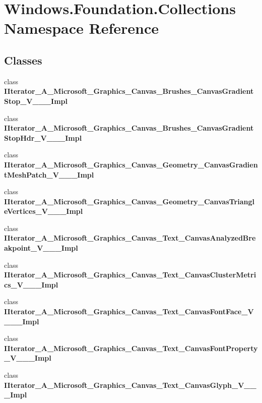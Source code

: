 \hypertarget{namespace_windows_1_1_foundation_1_1_collections}{}\section{Windows.\+Foundation.\+Collections Namespace Reference}
\label{namespace_windows_1_1_foundation_1_1_collections}
\subsection*{Classes}
\begin{DoxyCompactItemize}
\item 
class {\bfseries I\+Iterator\+\_\+\+A\+\_\+\+Microsoft\+\_\+\+Graphics\+\_\+\+Canvas\+\_\+\+Brushes\+\_\+\+Canvas\+Gradient\+Stop\+\_\+\+V\+\_\+\+\_\+\+\_\+\+Impl}
\item 
class {\bfseries I\+Iterator\+\_\+\+A\+\_\+\+Microsoft\+\_\+\+Graphics\+\_\+\+Canvas\+\_\+\+Brushes\+\_\+\+Canvas\+Gradient\+Stop\+Hdr\+\_\+\+V\+\_\+\+\_\+\+\_\+\+Impl}
\item 
class {\bfseries I\+Iterator\+\_\+\+A\+\_\+\+Microsoft\+\_\+\+Graphics\+\_\+\+Canvas\+\_\+\+Geometry\+\_\+\+Canvas\+Gradient\+Mesh\+Patch\+\_\+\+V\+\_\+\+\_\+\+\_\+\+Impl}
\item 
class {\bfseries I\+Iterator\+\_\+\+A\+\_\+\+Microsoft\+\_\+\+Graphics\+\_\+\+Canvas\+\_\+\+Geometry\+\_\+\+Canvas\+Triangle\+Vertices\+\_\+\+V\+\_\+\+\_\+\+\_\+\+Impl}
\item 
class {\bfseries I\+Iterator\+\_\+\+A\+\_\+\+Microsoft\+\_\+\+Graphics\+\_\+\+Canvas\+\_\+\+Text\+\_\+\+Canvas\+Analyzed\+Breakpoint\+\_\+\+V\+\_\+\+\_\+\+\_\+\+Impl}
\item 
class {\bfseries I\+Iterator\+\_\+\+A\+\_\+\+Microsoft\+\_\+\+Graphics\+\_\+\+Canvas\+\_\+\+Text\+\_\+\+Canvas\+Cluster\+Metrics\+\_\+\+V\+\_\+\+\_\+\+\_\+\+Impl}
\item 
class {\bfseries I\+Iterator\+\_\+\+A\+\_\+\+Microsoft\+\_\+\+Graphics\+\_\+\+Canvas\+\_\+\+Text\+\_\+\+Canvas\+Font\+Face\+\_\+\+V\+\_\+\+\_\+\+\_\+\+Impl}
\item 
class {\bfseries I\+Iterator\+\_\+\+A\+\_\+\+Microsoft\+\_\+\+Graphics\+\_\+\+Canvas\+\_\+\+Text\+\_\+\+Canvas\+Font\+Property\+\_\+\+V\+\_\+\+\_\+\+\_\+\+Impl}
\item 
class {\bfseries I\+Iterator\+\_\+\+A\+\_\+\+Microsoft\+\_\+\+Graphics\+\_\+\+Canvas\+\_\+\+Text\+\_\+\+Canvas\+Glyph\+\_\+\+V\+\_\+\+\_\+\+\_\+\+Impl}
\item 

\end{DoxyCompactItemize}
